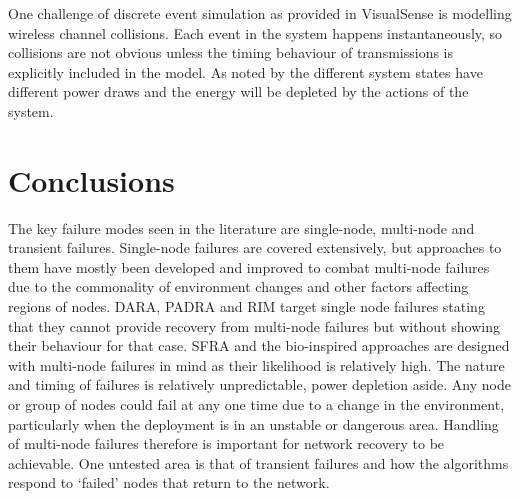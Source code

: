 \documentclass[authoryearcitations]{UoYCSproject}
\begin{document}
One challenge of discrete event simulation as provided in VisualSense is modelling wireless channel collisions. Each event in the system happens instantaneously, so collisions are not obvious unless the timing behaviour of transmissions is explicitly included in the model. As noted by \citeauthor{Rosello2009} the different system states have different power draws and the energy will be depleted by the actions of the system.



\section{Conclusions}






The key failure modes seen in the literature are single-node, multi-node and transient failures. Single-node failures are covered extensively, but approaches to them have mostly been developed and improved to combat multi-node failures due to the commonality of environment changes and other factors affecting regions of nodes. DARA, PADRA and RIM target single node failures stating that they cannot provide recovery from multi-node failures but without showing their behaviour for that case. SFRA and the bio-inspired approaches are designed with multi-node failures in mind as their likelihood is relatively high. The nature and timing of failures is relatively unpredictable, power depletion aside. Any node or group of nodes could fail at any one time due to a change in the environment, particularly when the deployment is in an unstable or dangerous area. Handling of multi-node failures therefore is important for network recovery to be achievable. One untested area is that of transient failures and how the algorithms respond to `failed' nodes that return to the network.
\end{document}

